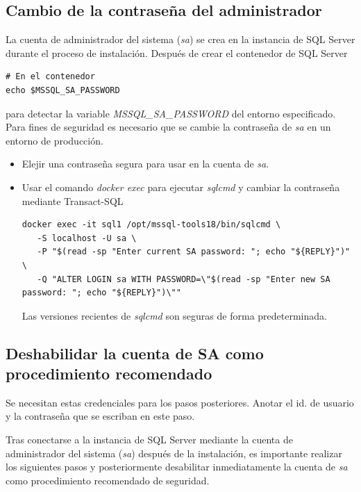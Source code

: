     \subsection{Cambio de la contraseña del administrador}
    La cuenta de administrador del sistema (\textit{sa}) se crea en la instancia de SQL Server durante el proceso de instalación. Después de crear el contenedor de SQL Server
\begin{lstlisting}
# En el contenedor
echo $MSSQL_SA_PASSWORD
\end{lstlisting}
    para detectar la variable \textit{MSSQL\_SA\_PASSWORD} del entorno especificado. Para fines de seguridad es necesario que se cambie la contraseña de \textit{sa} en un entorno de producción.
    \begin{itemize}
        \item[§] Elejir una contraseña segura para usar en la cuenta de \textit{sa}.
        \item[§] Usar el comando \textit{docker exec} para ejecutar \textit{sqlcmd} y cambiar la contraseña mediante Transact-SQL
\begin{lstlisting}
docker exec -it sql1 /opt/mssql-tools18/bin/sqlcmd \
   -S localhost -U sa \
   -P "$(read -sp "Enter current SA password: "; echo "${REPLY}")" \
   -Q "ALTER LOGIN sa WITH PASSWORD=\"$(read -sp "Enter new SA password: "; echo "${REPLY}")\""
\end{lstlisting}
        Las versiones recientes de \textit{sqlcmd} son seguras de forma predeterminada.
    \end{itemize}

    \subsection{Deshabilidar la cuenta de SA como procedimiento recomendado}
    \begin{tcolorbox}[bluebox]
        Se necesitan estas credenciales para los pasos posteriores. Anotar el id. de usuario y la contraseña que se escriban en este paso.
    \end{tcolorbox}
    Tras conectarse a la instancia de SQL Server mediante la cuenta de administrador del sistema (\textit{sa}) después de la instalación, es importante realizar los siguientes pasos y posteriormente desabilitar inmediatamente la cuenta de \textit{sa} como procedimiento recomendado de seguridad.